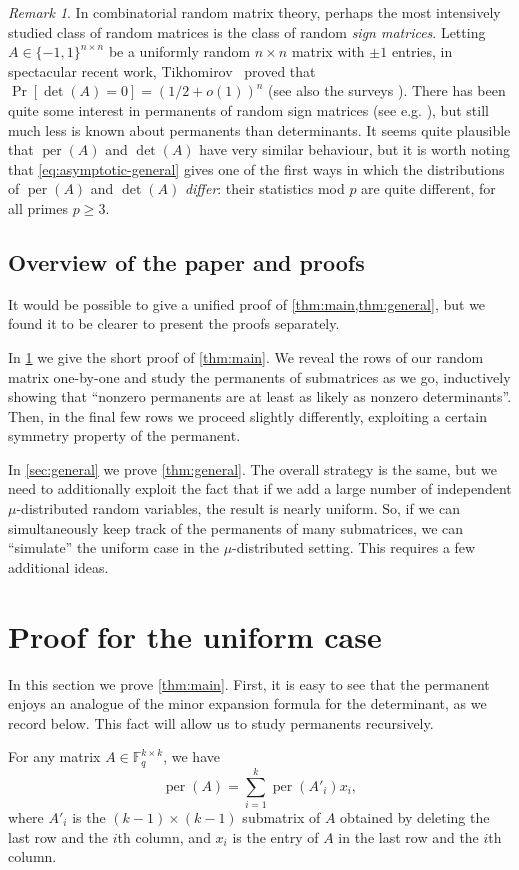 \documentclass[10pt,reqno]{amsart}
\numberwithin{equation}{section}
\theoremstyle{remark}
\newtheorem*{remark}{Remark}
\newcommand{\mb}{\mathbb}
\newcommand{\on}{\operatorname}
\begin{document}
\begin{remark}
In combinatorial random matrix theory, perhaps the most intensively studied class of random matrices is the class of random \emph{sign matrices}. Letting $A\in \{-1,1\}^{n\times n}$ be a uniformly random $n\times n$ matrix with $\pm 1$ entries, in spectacular recent work, Tikhomirov~\cite{Tik20} proved that $\Pr[\det(A)=0]=(1/2+o(1))^n$ (see also the surveys \cite{Vu14,Vu20,Gui23,Sah25}). There has been quite some interest in permanents of random sign matrices (see e.g. \cite{TV09,LM19,KS22,HKS25}), but still much less is known about permanents than determinants. It seems quite plausible that $\on{per}(A)$ and $\det(A)$ have very similar behaviour, but it is worth noting that \cref{eq:asymptotic-general} gives one of the first ways in which the distributions of $\on{per}(A)$ and $\det(A)$ \emph{differ}: their statistics mod $p$ are quite different, for all primes $p\ge 3$.
\end{remark}

\subsection{Overview of the paper and proofs} It would be possible to give a unified proof of \cref{thm:main,thm:general}, but we found it to be clearer to present the proofs separately.

In \cref{sec:uniform} we give the short proof of \cref{thm:main}. We reveal the rows of our random matrix one-by-one and study the permanents of submatrices as we go, inductively showing that ``nonzero permanents are at least as likely as nonzero determinants''. Then, in the final few rows we proceed slightly differently, exploiting a certain symmetry property of the permanent.

In \cref{sec:general} we prove \cref{thm:general}. The overall strategy is the same, but we need to additionally exploit the fact that if we add a large number of independent $\mu$-distributed random variables, the result is nearly uniform. So, if we can simultaneously keep track of the permanents of many submatrices, we can ``simulate'' the uniform case in the $\mu$-distributed setting. This requires a few additional ideas.

\section{Proof for the uniform case}\label{sec:uniform}
In this section we prove \cref{thm:main}. First, it is easy to see that the permanent enjoys an analogue of the minor expansion formula for the determinant, as we record below. This fact will allow us to study permanents recursively.
\begin{fact}\label{fact:minor-expansion}
For any matrix $A\in \mb F_q^{k\times k}$, we have
\[
\on{per}(A)=\sum_{i=1}^k\on{per}(A'_i) x_{i},
\]
where $A'_i$ is the $(k-1)\times (k-1)$ submatrix of $A$ obtained by deleting the last row and the $i$th column, and $x_i$ is the entry of $A$ in the last row and the $i$th column.
\end{fact}
\end{document}

